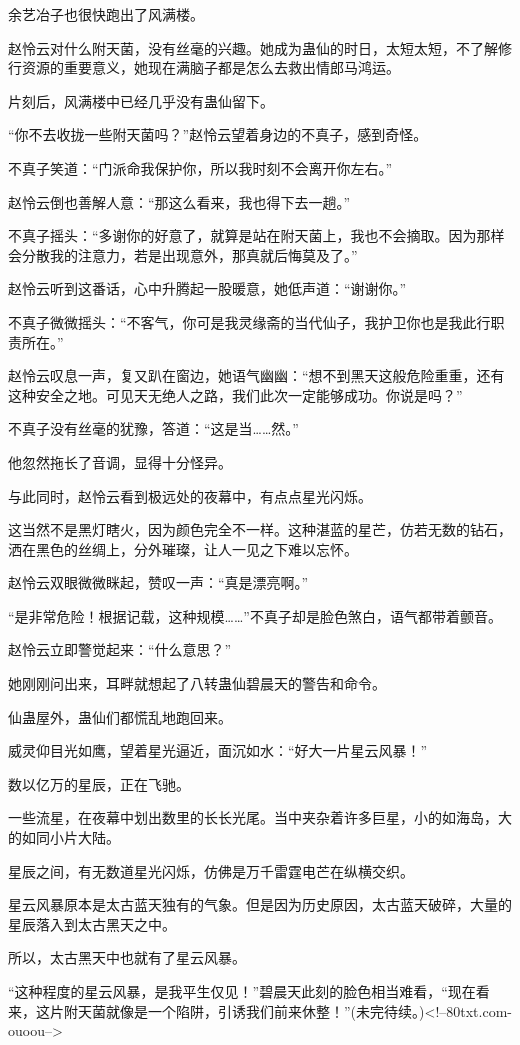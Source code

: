 \begin{this_body}
余艺冶子也很快跑出了风满楼。

赵怜云对什么附天菌，没有丝毫的兴趣。她成为蛊仙的时日，太短太短，不了解修行资源的重要意义，她现在满脑子都是怎么去救出情郎马鸿运。

片刻后，风满楼中已经几乎没有蛊仙留下。

“你不去收拢一些附天菌吗？”赵怜云望着身边的不真子，感到奇怪。

不真子笑道：“门派命我保护你，所以我时刻不会离开你左右。”

赵怜云倒也善解人意：“那这么看来，我也得下去一趟。”

不真子摇头：“多谢你的好意了，就算是站在附天菌上，我也不会摘取。因为那样会分散我的注意力，若是出现意外，那真就后悔莫及了。”

赵怜云听到这番话，心中升腾起一股暖意，她低声道：“谢谢你。”

不真子微微摇头：“不客气，你可是我灵缘斋的当代仙子，我护卫你也是我此行职责所在。”

赵怜云叹息一声，复又趴在窗边，她语气幽幽：“想不到黑天这般危险重重，还有这种安全之地。可见天无绝人之路，我们此次一定能够成功。你说是吗？”

不真子没有丝毫的犹豫，答道：“这是当……然。”

他忽然拖长了音调，显得十分怪异。

与此同时，赵怜云看到极远处的夜幕中，有点点星光闪烁。

这当然不是黑灯瞎火，因为颜色完全不一样。这种湛蓝的星芒，仿若无数的钻石，洒在黑色的丝绸上，分外璀璨，让人一见之下难以忘怀。

赵怜云双眼微微眯起，赞叹一声：“真是漂亮啊。”

“是非常危险！根据记载，这种规模……”不真子却是脸色煞白，语气都带着颤音。

赵怜云立即警觉起来：“什么意思？”

她刚刚问出来，耳畔就想起了八转蛊仙碧晨天的警告和命令。

仙蛊屋外，蛊仙们都慌乱地跑回来。

威灵仰目光如鹰，望着星光逼近，面沉如水：“好大一片星云风暴！”

数以亿万的星辰，正在飞驰。

一些流星，在夜幕中划出数里的长长光尾。当中夹杂着许多巨星，小的如海岛，大的如同小片大陆。

星辰之间，有无数道星光闪烁，仿佛是万千雷霆电芒在纵横交织。

星云风暴原本是太古蓝天独有的气象。但是因为历史原因，太古蓝天破碎，大量的星辰落入到太古黑天之中。

所以，太古黑天中也就有了星云风暴。

“这种程度的星云风暴，是我平生仅见！”碧晨天此刻的脸色相当难看，“现在看来，这片附天菌就像是一个陷阱，引诱我们前来休整！”(未完待续。)<!--80txt.com-ouoou-->

\end{this_body}

